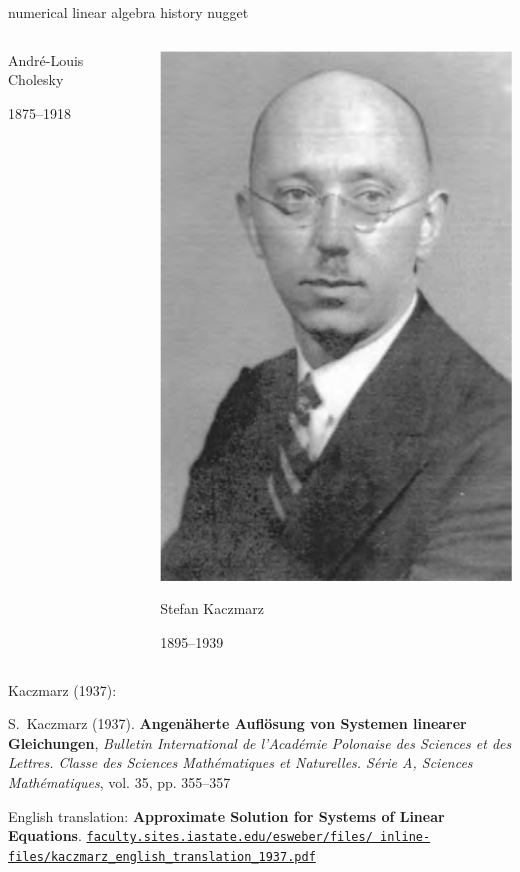 \documentclass[usepdftitle=false,usenames,dvipsnames]{beamer}
\begin{document}
\begin{frame}{numerical linear algebra history nugget}
\begin{columns}
\begin{column}{0.3\textwidth}
\footnotesize
Andr\'e-Louis Cholesky

1875--1918
\end{column}
\begin{column}{0.3\textwidth}
\centering
\includegraphics[height=0.5\textheight]{figs/StefanKaczmarz}

\footnotesize
Stefan Kaczmarz

1895--1939
\end{column}
\end{columns}
\end{frame}


\begin{frame}{Kaczmarz (1937):}

\begin{thebibliography}{1}
  {\footnotesize S.~Kaczmarz (1937). \textbf{Angenäherte Auflösung von Systemen linearer Gleichungen}, \emph{Bulletin International de l'Académie Polonaise des Sciences et des Lettres. Classe des Sciences Mathématiques et Naturelles. Série A, Sciences Mathématiques}, vol. 35, pp. \alert{355--357}}

  {\footnotesize English translation: \textbf{Approximate Solution for Systems of Linear Equations}. \href{https://faculty.sites.iastate.edu/esweber/files/inline-files/kaczmarz_english_translation_1937.pdf}{\texttt{faculty.sites.iastate.edu/esweber/files/ inline-files/kaczmarz\_english\_translation\_1937.pdf}}}
\end{thebibliography}
\end{frame}
\end{document}
